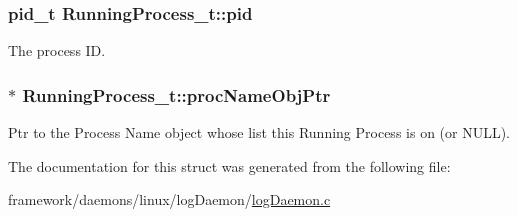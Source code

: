 \subsubsection[{\texorpdfstring{pid}{pid}}]{\setlength{\rightskip}{0pt plus 5cm}pid\+\_\+t Running\+Process\+\_\+t\+::pid}\hypertarget{struct_running_process__t_aaba42a3a261c073524f65bb8b256b76e}{}\label{struct_running_process__t_aaba42a3a261c073524f65bb8b256b76e}


The process ID. 

\subsubsection[{\texorpdfstring{proc\+Name\+Obj\+Ptr}{procNameObjPtr}}]{$\ast$ Running\+Process\+\_\+t\+::proc\+Name\+Obj\+Ptr}\hypertarget{struct_running_process__t_aef73f3e1f47942b50a13fc5b7fd0660e}{}\label{struct_running_process__t_aef73f3e1f47942b50a13fc5b7fd0660e}
Ptr to the Process Name object whose list this Running Process is on (or N\+U\+LL). 

The documentation for this struct was generated from the following file\+:\begin{DoxyCompactItemize}
\item 
framework/daemons/linux/log\+Daemon/\hyperlink{log_daemon_8c}{log\+Daemon.\+c}\end{DoxyCompactItemize}
